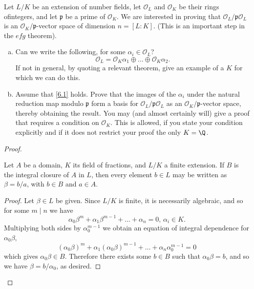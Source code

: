 \documentclass[10pt]{amsart}
\begin{document}
\begin{thm}\label{Ex5}
\end{thm}

\begin{thm}\label{Ex6}
	Let $L/K$ be an extension of number fields, let $\mathcal{O}_L$ and $\mathcal{O}_K$ be their rings ofintegers, and let $\mathfrak{p}$ be a prime of $\mathcal{O}_K$.
	We are interested in proving that $\mathcal{O}_L/\mathfrak{p}\mathcal{O}_L$ is an $\mathcal{O}_K/\mathfrak{p}$-vector space of dimension $n = [L : K]$.
	(This is an important step in the $efg$ theorem).
	\begin{enumerate}[(a)]
		\item
		Can we write the following, for some $\alpha_i \in \mathcal{O}_L$?
		\begin{equation}\label{6.1}
			\mathcal{O}_L = \mathcal{O}_K\alpha_1 \oplus \ldots \oplus \mathcal{O}_K\alpha_2.
		\end{equation}
		If not in general, by quoting a relevant theorem, give an example of a $K$ for which we can do this.
		\item
		Assume that \eqref{6.1} holds.
		Prove that the images of the $\alpha_i$ under the natural reduction map modulo $\mathfrak{p}$ form a basis for $\mathcal{O}_L/\mathfrak{p}\mathcal{O}_L$ as an $\mathcal{O}_K/\mathfrak{p}$-vector space, thereby obtaining the result.
		You may (and almost certainly will) give a proof that requires a condition on $\mathcal{O}_K$.
		This is allowed, if you state your condition explicitly and if it does not restrict your proof the only $K = \Q$.
	\end{enumerate}
	\begin{proof}
		\begin{lem}\label{L.6.1}
			Let $A$ be a domain, $K$ its field of fractions, and $L/K$ a finite extension.  
			If $B$ is the integral closure of $A$ in $L$, then every element $b \in L$ may be written as $\beta = b/a$, with $b \in B$ and $a \in A$.
		\begin{proof}
			Let $\beta \in L$ be given.
			Since $L/K$ is finite, it is necessarily algebraic, and so for some $m \mid n$ we have
			$$\alpha_0\beta^m + \alpha_1\beta^{m-1} + \ldots + \alpha_n = 0,\, \alpha_i \in K.$$
			Multiplying both sides by $\alpha_0^{m-1}$ we obtain an equation of integral dependence for $\alpha_0\beta$,
			$$\left(\alpha_0\beta\right)^m + \alpha_1(\alpha_0\beta)^{m-1} + \ldots + \alpha_n\alpha_0^{m-1} = 0$$
			which gives $\alpha_0\beta \in B$.
			Therefore there exists some $b \in B$ such that $\alpha_0\beta = b$, and so we have $\beta = b/\alpha_0$, as desired.
		\end{proof}
		\end{lem}


\end{proof}
\end{thm}
\end{document}
